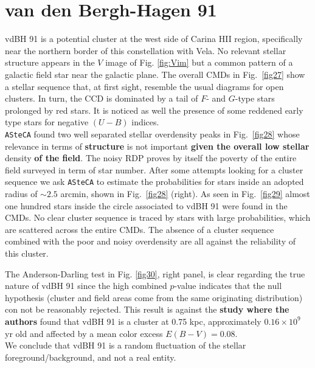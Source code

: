 \documentclass[referee]{aa}
\begin{document}
\section{van den Bergh-Hagen 91}

vdBH 91 is a potential cluster at the west side of Carina HII
region, specifically near the northern border of this constellation with Vela.
No relevant stellar structure appears in the $V$ image of Fig. \ref{fig:Vim}
but a common pattern of a galactic field star near the galactic plane.
The overall CMDs in Fig.~\ref{fig27} show a stellar sequence that, at first
sight, resemble the usual diagrams for open clusters. In turn, the CCD
is dominated by a tail of $F$- and $G$-type stars prolonged by red stars. It is
noticed as well the presence of some reddened early type stars for negative
$(U-B)$ indices.\\

\texttt{ASteCA} found two well separated stellar overdensity peaks in
Fig.~\ref{fig28} whose relevance in terms of \textbf{structure} is not
important \textbf{given the overall low stellar} density \textbf{of the field}.
The noisy RDP proves by itself the poverty of the entire field surveyed in term
of star number.
After some attempts looking for a cluster sequence we ask \texttt{ASteCA} to
estimate the probabilities for stars inside an adopted radius
of $\sim2.5$ arcmin, shown in Fig.~\ref{fig28} (right).
As seen in Fig.~\ref{fig29} almost one hundred stars inside the circle
associated to vdBH 91 were found in the CMDs.
No clear cluster sequence is traced by stars with large probabilities, which
are scattered across the entire CMDs. The absence of a cluster sequence
combined with the poor and noisy overdensity are all against the reliability of
this cluster.

The Anderson-Darling test in Fig. \ref{fig30}, right panel, is clear regarding
the true nature of vdBH 91 since the high combined $p$-value
indicates that the null hypothesis (cluster and field areas come from the same
originating distribution) con not be reasonably rejected. This result is against
the \cite{Kharchenko_2005} \textbf{study where the authors} found that vdBH 91
is a cluster at 0.75 kpc, approximately $0.16\times10^9$ yr old and affected by
a mean color excess $E(B-V)=0.08$.\\

We conclude that vdBH 91 is a random fluctuation of the stellar
foreground/background, and not a real entity.
\end{document}
